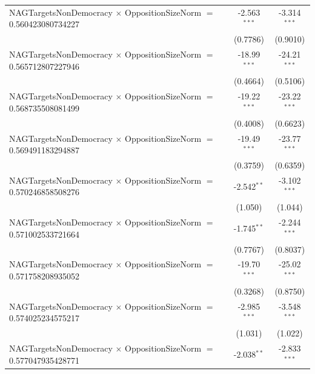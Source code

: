 \begin{tabular}{lcc}
   NAGTargetsNonDemocracy $\times$ OppositionSizeNorm $=$ 0.560423080734227     & -2.563$^{***}$       & -3.314$^{***}$\\   
                                                                                & (0.7786)             & (0.9010)\\   
   NAGTargetsNonDemocracy $\times$ OppositionSizeNorm $=$ 0.565712807227946     & -18.99$^{***}$       & -24.21$^{***}$\\   
                                                                                & (0.4664)             & (0.5106)\\   
   NAGTargetsNonDemocracy $\times$ OppositionSizeNorm $=$ 0.568735508081499     & -19.22$^{***}$       & -23.22$^{***}$\\   
                                                                                & (0.4008)             & (0.6623)\\   
   NAGTargetsNonDemocracy $\times$ OppositionSizeNorm $=$ 0.569491183294887     & -19.49$^{***}$       & -23.77$^{***}$\\   
                                                                                & (0.3759)             & (0.6359)\\   
   NAGTargetsNonDemocracy $\times$ OppositionSizeNorm $=$ 0.570246858508276     & -2.542$^{**}$        & -3.102$^{***}$\\   
                                                                                & (1.050)              & (1.044)\\   
   NAGTargetsNonDemocracy $\times$ OppositionSizeNorm $=$ 0.571002533721664     & -1.745$^{**}$        & -2.244$^{***}$\\   
                                                                                & (0.7767)             & (0.8037)\\   
   NAGTargetsNonDemocracy $\times$ OppositionSizeNorm $=$ 0.571758208935052     & -19.70$^{***}$       & -25.02$^{***}$\\   
                                                                                & (0.3268)             & (0.8750)\\   
   NAGTargetsNonDemocracy $\times$ OppositionSizeNorm $=$ 0.574025234575217     & -2.985$^{***}$       & -3.548$^{***}$\\   
                                                                                & (1.031)              & (1.022)\\   
   NAGTargetsNonDemocracy $\times$ OppositionSizeNorm $=$ 0.577047935428771     & -2.038$^{**}$        & -2.833$^{***}$\\   

\end{tabular}

